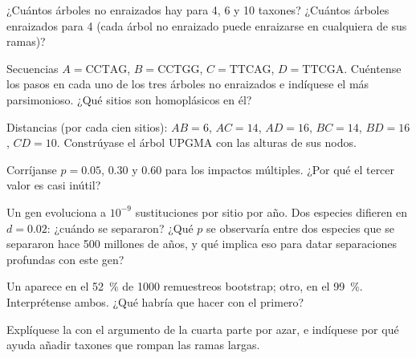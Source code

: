 \begin{exercise}[$\star$]\label{exo:b2:phylogenetic-trees:4}
¿Cuántos árboles no enraizados hay para 4, 6 y 10 taxones? ¿Cuántos
árboles enraizados para 4 (cada árbol no enraizado puede enraizarse en
cualquiera de sus ramas)?
\end{exercise}

\begin{exercise}[$\star\star$]\label{exo:b2:phylogenetic-trees:5}
Secuencias $A = \mathrm{CCTAG}$, $B = \mathrm{CCTGG}$, $C =
\mathrm{TTCAG}$, $D = \mathrm{TTCGA}$. Cuéntense los pasos en cada uno de
los tres árboles no enraizados e indíquese el más parsimonioso. ¿Qué
sitios son homoplásicos en él?
\end{exercise}

\begin{exercise}[$\star\star$]\label{exo:b2:phylogenetic-trees:6}
Distancias (por cada cien sitios): $AB = 6$, $AC = 14$, $AD = 16$,
$BC = 14$, $BD = 16$, $CD = 10$. Constrúyase el árbol UPGMA con las
alturas de sus nodos.
\end{exercise}

\begin{exercise}[$\star\star$]\label{exo:b2:phylogenetic-trees:7}
Corríjanse $p = 0.05$, $0.30$ y $0.60$ para los impactos múltiples. ¿Por
qué el tercer valor es casi inútil?
\end{exercise}

\begin{exercise}[$\star\star$]\label{exo:b2:phylogenetic-trees:8}
Un gen evoluciona a $10^{-9}$ sustituciones por sitio por año. Dos
especies difieren en $d = 0.02$: ¿cuándo se separaron? ¿Qué $p$ se
observaría entre dos especies que se separaron hace 500 millones de años,
y qué implica eso para datar separaciones profundas con este gen?
\end{exercise}

\begin{exercise}[$\star\star$]\label{exo:b2:phylogenetic-trees:9}
Un  aparece en el \qty{52}{\%} de \num{1000} remuestreos bootstrap;
otro, en el \qty{99}{\%}. Interprétense ambos. ¿Qué habría que hacer con el
primero?
\end{exercise}

\begin{exercise}[$\star\star\star$]\label{exo:b2:phylogenetic-trees:10}
Explíquese la  con el argumento de la cuarta
parte por azar, e indíquese por qué ayuda añadir taxones que rompan las
ramas largas.
\end{exercise}

